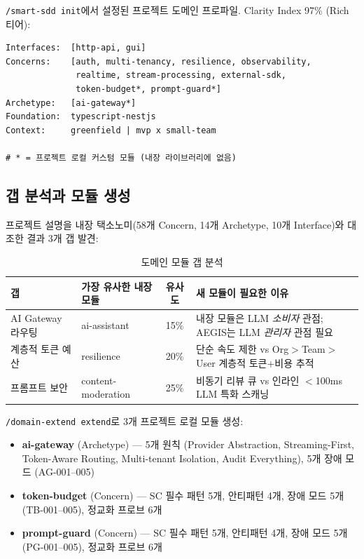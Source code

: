\documentclass[11pt,a4paper,openright,twoside]{report}
\newcommand{\cmd}[1]{\texttt{/#1}}
\begin{document}
\cmd{smart-sdd init}에서 설정된 프로젝트 도메인 프로파일. Clarity Index 97\% (Rich 티어):

\begin{lstlisting}[style=specstyle, title={AEGIS Domain Profile}]
Interfaces:  [http-api, gui]
Concerns:    [auth, multi-tenancy, resilience, observability,
              realtime, stream-processing, external-sdk,
              token-budget*, prompt-guard*]
Archetype:   [ai-gateway*]
Foundation:  typescript-nestjs
Context:     greenfield | mvp x small-team

# * = 프로젝트 로컬 커스텀 모듈 (내장 라이브러리에 없음)
\end{lstlisting}

\subsection{갭 분석과 모듈 생성}

프로젝트 설명을 내장 택소노미(58개 Concern, 14개 Archetype, 10개 Interface)와 대조한 결과 3개 갭 발견:

\begin{table}[H]
\centering
\caption{도메인 모듈 갭 분석}
\label{tab:aegis-gaps-ko}
\begin{tabularx}{\textwidth}{llcX}
\toprule
\textbf{갭} & \textbf{가장 유사한 내장 모듈} & \textbf{유사도} & \textbf{새 모듈이 필요한 이유} \\
\midrule
AI Gateway 라우팅 & ai-assistant & 15\% & 내장 모듈은 LLM \emph{소비자} 관점; AEGIS는 LLM \emph{관리자} 관점 필요 \\
계층적 토큰 예산 & resilience & 20\% & 단순 속도 제한 vs Org$>$Team$>$User 계층적 토큰+비용 추적 \\
프롬프트 보안 & content-moderation & 25\% & 비동기 리뷰 큐 vs 인라인 $<$100ms LLM 특화 스캐닝 \\
\bottomrule
\end{tabularx}
\end{table}

\cmd{domain-extend extend}로 3개 프로젝트 로컬 모듈 생성:

\begin{itemize}[nosep]
  \item \textbf{ai-gateway} (Archetype) --- 5개 원칙 (Provider Abstraction, Streaming-First, Token-Aware Routing, Multi-tenant Isolation, Audit Everything), 5개 장애 모드 (AG-001--005)
  \item \textbf{token-budget} (Concern) --- SC 필수 패턴 5개, 안티패턴 4개, 장애 모드 5개 (TB-001--005), 정교화 프로브 6개
  \item \textbf{prompt-guard} (Concern) --- SC 필수 패턴 5개, 안티패턴 4개, 장애 모드 5개 (PG-001--005), 정교화 프로브 6개
\end{itemize}
\end{document}
